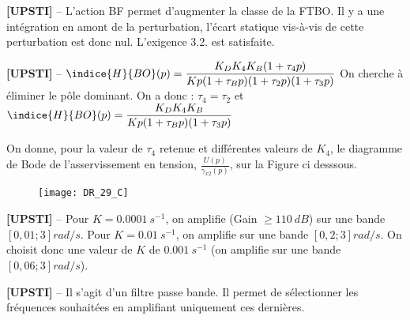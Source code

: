 \ifprof
\begin{corrige}%
\textbf{[UPSTI]} -- L’action BF permet d’augmenter la classe de la FTBO. Il y a une intégration en amont de la perturbation, l’écart statique vis-à-vis de cette perturbation est donc nul. L’exigence 3.2. est satisfaite.
\end{corrige}
\else
\fi

\ifprof
\begin{corrige}%
\textbf{[UPSTI]} -- 
$\indice{H}{BO} (p)=\dfrac{K_D K_4 K_B (1+\tau_4 p)}{Kp(1+\tau_B p)(1+\tau_2 p)(1+\tau_3 p)}$
On cherche à éliminer le pôle dominant. On a donc : $\tau_4=\tau_2$ et  
$\indice{H}{BO} (p)=\dfrac{K_D K_4 K_B}{Kp(1+\tau_B p)(1+\tau_3 p)}$

\end{corrige}
\else
\fi

\ifprof
\else
On donne, pour la valeur de $\tau_{4}$ retenue et différentes valeurs de $K_{4}$, le diagramme de Bode de l'asservissement en tension, $\frac{U(p)}{\gamma_{x 2}(p)}$, sur la Figure ci desssous. %
\fi

\begin{figure}[!h]
\centering
\texttt{[image: DR\_29\_C]}
\end{figure}

\ifprof
\begin{corrige}%
\textbf{[UPSTI]} --
Pour $K = \SI{0,0001}{s^{-1}}$, on amplifie (Gain $\geq \SI{110}{dB}$) sur une bande $\left[0,01 ; 3\right] \si{rad/s}$.
Pour $K = \SI{0,01}{s^{-1}}$, on amplifie sur une bande $\left[0,2 ; 3\right] \si{rad/s}$.
On choisit donc une valeur de $K$ de $\SI{0,001}{s^{-1}}$ (on amplifie sur une bande $\left[0,06 ; 3\right] \si{rad/s}$).

\end{corrige}
\else
\fi

\ifprof
\begin{corrige}%
\textbf{[UPSTI]} -- 
Il s’agit d’un filtre passe bande. Il permet de sélectionner les fréquences souhaitées en amplifiant uniquement ces dernières.
\end{corrige}
\else
\fi



